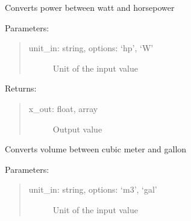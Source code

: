 \documentclass[letterpaper,10pt,english,openany]{sphinxmanual}
\begin{document}
\begin{fulllineitems}
\begin{fulllineitems}
\begin{quote}
\begin{description}
\end{description}
\end{quote}

\end{fulllineitems}


\begin{fulllineitems}
\label{\detokenize{source/mswh.tools:mswh.tools.unit_converters.UnitConv.hp_W}}
Converts power between watt and horsepower

Parameters:
\begin{quote}
\begin{description}
\item[{unit\_in: string, options: ‘hp’, ‘W’}] \leavevmode
Unit of the input value

\end{description}
\end{quote}

Returns:
\begin{quote}
\begin{description}
\item[{x\_out: float, array}] \leavevmode
Output value

\end{description}
\end{quote}

\end{fulllineitems}


\begin{fulllineitems}
\label{\detokenize{source/mswh.tools:mswh.tools.unit_converters.UnitConv.m3_gal}}
Converts volume between cubic meter and gallon

Parameters:
\begin{quote}
\begin{description}
\item[{unit\_in: string, options: ‘m3’, ‘gal’}] \leavevmode
Unit of the input value

\end{description}
\end{quote}


\end{fulllineitems}
\end{fulllineitems}
\end{document}
